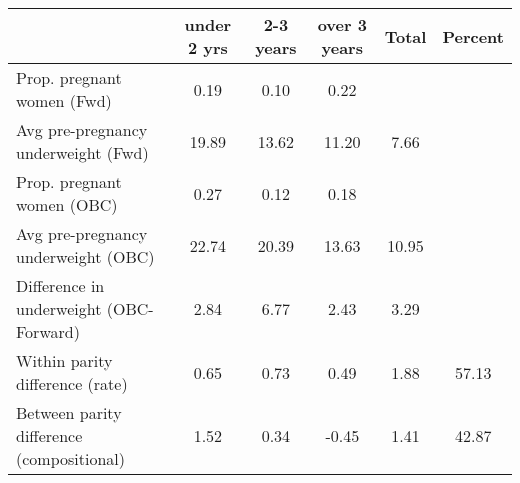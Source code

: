 \begin{tabular}{l*{5}{c}}
\toprule
            &\multicolumn{1}{c}{under 2 yrs}&\multicolumn{1}{c}{2-3 years}&\multicolumn{1}{c}{over 3 years}&\multicolumn{1}{c}{Total}&\multicolumn{1}{c}{Percent}\\
\midrule
\midrule
Prop. pregnant women (Fwd)&        0.19&        0.10&        0.22&            &            \\
Avg pre-pregnancy underweight (Fwd)&       19.89&       13.62&       11.20&        7.66&            \\
Prop. pregnant women (OBC)&        0.27&        0.12&        0.18&            &            \\
Avg pre-pregnancy underweight (OBC)&       22.74&       20.39&       13.63&       10.95&            \\
Difference in underweight (OBC-Forward)&        2.84&        6.77&        2.43&        3.29&            \\
Within parity difference (rate)&        0.65&        0.73&        0.49&        1.88&       57.13\\
Between parity difference (compositional)&        1.52&        0.34&       -0.45&        1.41&       42.87\\
\bottomrule
\end{tabular}
